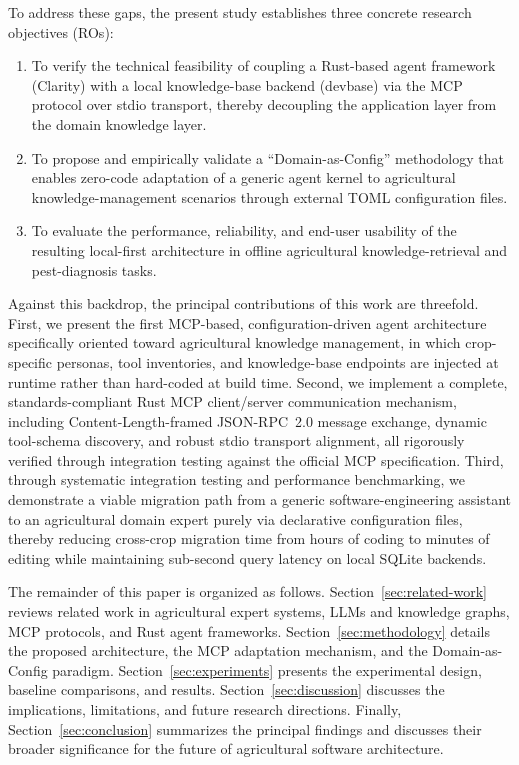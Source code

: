 \documentclass[11pt,a4paper]{article}
\begin{document}
To address these gaps, the present study establishes three concrete research objectives (ROs):
\begin{enumerate}[label=RO\arabic*:,leftmargin=*]
    \item To verify the technical feasibility of coupling a Rust-based agent framework (Clarity) with a local knowledge-base backend (devbase) via the MCP protocol over stdio transport, thereby decoupling the application layer from the domain knowledge layer.
    \item To propose and empirically validate a ``Domain-as-Config'' methodology that enables zero-code adaptation of a generic agent kernel to agricultural knowledge-management scenarios through external TOML configuration files.
    \item To evaluate the performance, reliability, and end-user usability of the resulting local-first architecture in offline agricultural knowledge-retrieval and pest-diagnosis tasks.
\end{enumerate}

Against this backdrop, the principal contributions of this work are threefold. First, we present the first MCP-based, configuration-driven agent architecture specifically oriented toward agricultural knowledge management, in which crop-specific personas, tool inventories, and knowledge-base endpoints are injected at runtime rather than hard-coded at build time. Second, we implement a complete, standards-compliant Rust MCP client/server communication mechanism, including Content-Length-framed JSON-RPC~2.0 message exchange, dynamic tool-schema discovery, and robust stdio transport alignment, all rigorously verified through integration testing against the official MCP specification. Third, through systematic integration testing and performance benchmarking, we demonstrate a viable migration path from a generic software-engineering assistant to an agricultural domain expert purely via declarative configuration files, thereby reducing cross-crop migration time from hours of coding to minutes of editing while maintaining sub-second query latency on local SQLite backends.

The remainder of this paper is organized as follows. Section~\ref{sec:related-work} reviews related work in agricultural expert systems, LLMs and knowledge graphs, MCP protocols, and Rust agent frameworks. Section~\ref{sec:methodology} details the proposed architecture, the MCP adaptation mechanism, and the Domain-as-Config paradigm. Section~\ref{sec:experiments} presents the experimental design, baseline comparisons, and results. Section~\ref{sec:discussion} discusses the implications, limitations, and future research directions. Finally, Section~\ref{sec:conclusion} summarizes the principal findings and discusses their broader significance for the future of agricultural software architecture.
\end{document}
